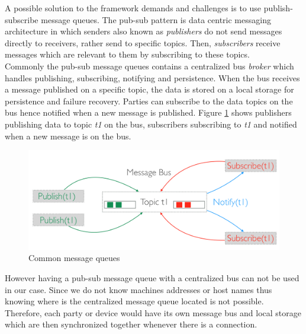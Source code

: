  

\noindent A possible solution to the framework demands and challenges is to use publish-subscribe message queues. The pub-sub pattern is data centric messaging architecture in which senders also known as \textit{publishers} do not send messages directly to receivers, rather send to specific topics. Then, \textit{subscribers} receive messages which are relevant to them by subscribing to these topics. \\


\noindent Commonly the pub-sub message queues contains a centralized bus \textit{broker} which handles publishing, subscribing, notifying and persistence. 
When the bus receives a message published on a specific topic, the data is stored on a local storage for persistence and failure recovery. 
Parties can subscribe to the data topics on the  bus hence notified when a new message is published. Figure \ref{fig:message-queues} shows  publishers publishing data to topic \textit{t1} on the bus, subscribers subscribing to \textit{t1} and notified when a new message is on the bus.
	
\begin{figure}[H]
	\centering
	\includegraphics[scale=0.3]{images/message-queues.png}
	\caption{Common message queues}
	\label{fig:message-queues}
\end{figure}

\noindent However having a pub-sub message queue with a centralized bus can not be used in our case. Since we do not know machines addresses or host names thus knowing where is the centralized message queue located is not possible. Therefore, each party or device would have its own message bus and local storage which are then synchronized together whenever there is a connection.

